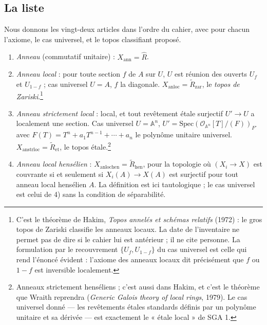\documentclass[11pt,a4paper]{article}
\begin{document}
\subsection*{La liste}

Nous donnons les vingt-deux articles dans l'ordre du cahier, avec pour
chacun l'axiome, le cas universel, et le topos classifiant proposé.

\begin{enumerate}
\item[1)] \emph{Anneau} (commutatif unitaire) : $X_{\mathrm{ann}} =
\widehat{R}$.

\item[2)] \emph{Anneau local} : pour toute section $f$ de $A$ sur $U$, $U$
est réunion des ouverts $U_{f}$ et $U_{1-f}$ ; cas universel $U = A$, $f$
la diagonale. $X_{\mathrm{anloc}} = \widetilde{R}_{\mathrm{zar}}$, le
\emph{topos de Zariski}.\footnote{C'est le théorème de Hakim, \emph{Topos
annelés et schémas relatifs} (1972) : le gros topos de Zariski classifie
les anneaux locaux. La date de l'inventaire ne permet pas de dire si le
cahier lui est antérieur ; il ne cite personne. La formulation par le
recouvrement $\{U_{f}, U_{1-f}\}$ du cas universel est celle qui rend
l'énoncé évident : l'axiome des anneaux locaux dit précisément que $f$ ou
$1-f$ est inversible localement.}

\item[4)] \emph{Anneau strictement local} : local, et tout revêtement étale
surjectif $U' \to U$ a localement une section. Cas universel $U =
\mathbb{A}^{n}$, $U' = \mathrm{Spec}(\mathcal{O}_{\mathbb{A}^{n}}[T]/(F))_{F'}$
avec $F(T) = T^{n} + a_{1}T^{n-1} + \cdots + a_{n}$ le polynôme unitaire
universel. $X_{\mathrm{anstrloc}} = \widetilde{R}_{\mathrm{et}}$, le topos
étale.\footnote{Anneaux strictement henséliens ; c'est aussi dans Hakim, et
c'est le théorème que Wraith reprendra (\emph{Generic Galois theory of local
rings}, 1979). Le cas universel donné — les revêtements étales standards
définis par un polynôme unitaire et sa dérivée — est exactement le
« étale local » de SGA 1.}

\item[3)] \emph{Anneau local hensélien} : $X_{\mathrm{anlochen}} =
\widetilde{R}_{\mathrm{hen}}$, pour la topologie où $(X_{i} \to X)$ est
couvrante si et seulement si $X_{i}(A) \to X(A)$ est surjectif pour tout
anneau local hensélien $A$. La définition est ici tautologique ; le cas
universel est celui de 4) sans la condition de séparabilité.


\end{enumerate}
\end{document}
